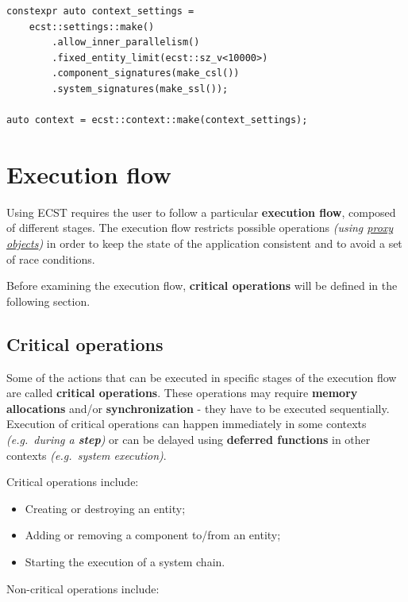 \documentclass[oneside, 12pt, a4paper, openany]{book}
\begin{document}
\begin{verbatim}
constexpr auto context_settings =
    ecst::settings::make()
        .allow_inner_parallelism()
        .fixed_entity_limit(ecst::sz_v<10000>)
        .component_signatures(make_csl())
        .system_signatures(make_ssl());

auto context = ecst::context::make(context_settings);
\end{verbatim}

\hypertarget{chap_flow}{\chapter{Execution flow}\label{chap_flow}}

Using ECST requires the user to follow a particular \textbf{execution
flow}, composed of different stages. The execution flow restricts
possible operations \emph{(using \protect\hyperlink{chap_proxies}{proxy
objects})} in order to keep the state of the application consistent and
to avoid a set of race conditions.

Before examining the execution flow, \textbf{critical operations} will
be defined in the following section.

\section{Critical operations}\label{critical-operations}

Some of the actions that can be executed in specific stages of the
execution flow are called \textbf{critical operations}. These operations
may require \textbf{memory allocations} and/or \textbf{synchronization}
- they have to be executed sequentially. Execution of critical
operations can happen immediately in some contexts \emph{(e.g.~during a
\textbf{step})} or can be delayed using \textbf{deferred functions} in
other contexts \emph{(e.g.~system execution)}.

Critical operations include:

\begin{itemize}
\item
  Creating or destroying an entity;
\item
  Adding or removing a component to/from an entity;
\item
  Starting the execution of a system chain.
\end{itemize}

Non-critical operations include:
\end{document}
